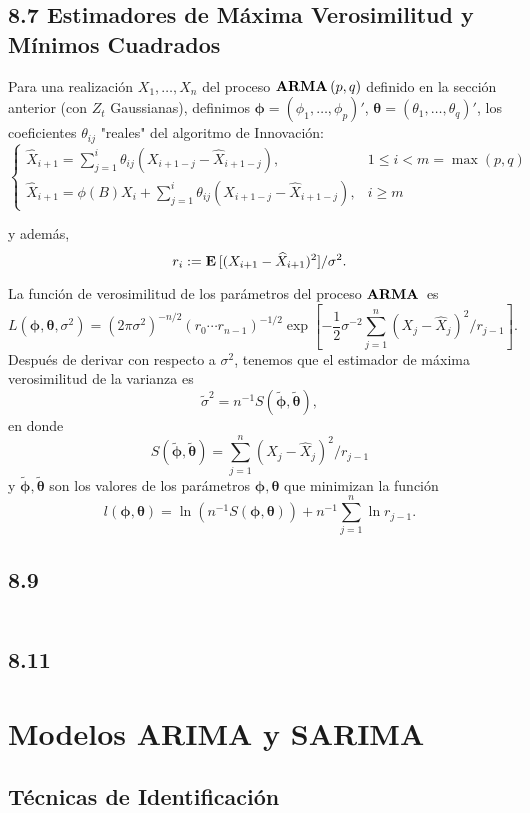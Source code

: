 \documentclass[11pt]{article}
\def\E{\ensuremath{\textbf{E\,}}}
\def\ARMA{\ensuremath{\textbf{ARMA\,}}}
\theoremstyle{definition}
\newcommand\wh[1]{\widehat{#1}}
\begin{document}
\subsection*{8.7 Estimadores de Máxima Verosimilitud y Mínimos Cuadrados}

Para una realización $X_1,\ldots, X_n$ del proceso $\ARMA(p,q)$ definido en la sección anterior (con $Z_t$ Gaussianas), definimos $\bm{\phi} = (\phi_1,\ldots,\phi_p)'$, $\bm{\theta} = (\theta_1,\ldots, \theta_q)'$, los coeficientes $\theta_{ij}$ "reales" del algoritmo de Innovación:
\[ \begin{cases}
    \wh{X}_{i+1} = \sum_{j = 1}^i \theta_{ij} (X_{i+1-j} - \wh{X}_{i+1-j}), & 1 \leq i < m = \max(p,q)\\[1em]
    \wh{X}_{i+1} = \phi(B) X_i + \sum_{j = 1}^i \theta_{ij} (X_{i+1-j} - \wh{X}_{i+1-j}), & i \geq m
\end{cases} \]

y además,
\[ r_i := \E[(X_{i+1}- \wh{X}_{i+1})^2] / \sigma^2. \]

La función de verosimilitud de los parámetros del proceso $\ARMA$ es
\[ L(\bm{\phi}, \bm{\theta}, \sigma^2) = (2\pi \sigma^2)^{-n/2}(r_0\cdots r_{n-1})^{-1/2} \exp\left[ -\frac{1}{2}\sigma^{-2} \sum_{j = 1}^n (X_j - \wh{X}_j)^2/r_{j-1} \right] . \]
Después de derivar con respecto a $\sigma^2$, tenemos que el estimador de máxima verosimilitud de la varianza es
\[ \tilde{\sigma}^2 = n^{-1} S(\tilde{\bm{\phi}},\tilde{\bm{\theta}}), \]
en donde
\[ S(\tilde{\bm{\phi}},\tilde{\bm{\theta}}) = \sum_{j = 1}^n (X_j - \wh{X}_j)^2/r_{j-1} \]
y $\tilde{\bm{\phi}},\tilde{\bm{\theta}}$ son los valores de los parámetros $\bm\phi,\bm\theta$ que minimizan la función
\[ l(\bm\phi,\bm\theta) = \ln(n^{-1}S(\bm\phi,\bm\theta)) + n^{-1} \sum_{j = 1}^n \ln r_{j-1}. \]

\subsection*{8.9 }
$\wh{}$

\subsection*{8.11 }

\section{Modelos ARIMA y SARIMA}

\subsection*{Técnicas de Identificación}



% 
 
\end{document}

